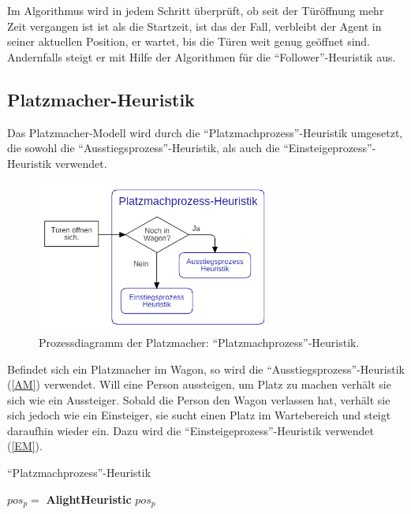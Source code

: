 Im Algorithmus wird in jedem Schritt überprüft, ob seit der Türöffnung mehr Zeit vergangen ist ist als die Startzeit, ist das der Fall, verbleibt der Agent in seiner aktuellen Position, er wartet, bis die Türen weit genug geöffnet sind. Andernfalls steigt er mit Hilfe der Algorithmen für die "`Follower"'-Heuristik aus.

\subsection{Platzmacher-Heuristik}
Das Platzmacher-Modell wird durch die "`Platzmachprozess"'-Heuristik umgesetzt, die sowohl die "`Ausstiegsprozess"'-Heuristik, als auch die "`Einsteigeprozess"'-Heuristik verwendet.
\begin{figure}[H]
	\centering
		\includegraphics[width=0.7\textwidth]{pictures/model/algorithm/spacemaker/spacemaker_heuristic.png}
	\caption{Prozessdiagramm der Platzmacher: "`Platzmachprozess"'-Heuristik.}
	\label{fig:PH}
\end{figure}
Befindet sich ein Platzmacher im Wagon, so wird die "`Ausstiegsprozess"'-Heuristik (\ref{AM}) verwendet. Will eine Person aussteigen, um Platz zu machen verhält sie sich wie ein Aussteiger. Sobald die Person den Wagon verlassen hat, verhält sie sich jedoch wie ein Einsteiger, sie sucht einen Platz im Wartebereich und steigt daraufhin wieder ein. Dazu wird die "`Einsteigeprozess"'-Heuristik verwendet (\ref{EM}).

\begin{algorithm} [H]
	\caption{"`Platzmachprozess"'-Heuristik}
	
	\SpacemakerHeuristic{} {
		  {
			$pos_p = $ \textbf{AlightHeuristic}
		} 
		\Return $pos_p$
	}
\end{algorithm}

